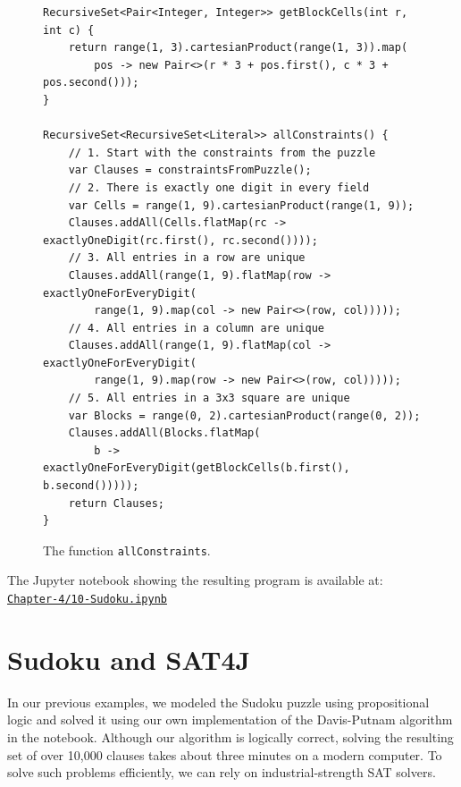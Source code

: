 \begin{figure}[!ht]
\centering
\begin{verbatim}
RecursiveSet<Pair<Integer, Integer>> getBlockCells(int r, int c) {
    return range(1, 3).cartesianProduct(range(1, 3)).map(
        pos -> new Pair<>(r * 3 + pos.first(), c * 3 + pos.second()));
}

RecursiveSet<RecursiveSet<Literal>> allConstraints() {
    // 1. Start with the constraints from the puzzle
    var Clauses = constraintsFromPuzzle();
    // 2. There is exactly one digit in every field
    var Cells = range(1, 9).cartesianProduct(range(1, 9));
    Clauses.addAll(Cells.flatMap(rc -> exactlyOneDigit(rc.first(), rc.second())));
    // 3. All entries in a row are unique
    Clauses.addAll(range(1, 9).flatMap(row -> exactlyOneForEveryDigit(
        range(1, 9).map(col -> new Pair<>(row, col)))));
    // 4. All entries in a column are unique
    Clauses.addAll(range(1, 9).flatMap(col -> exactlyOneForEveryDigit(
        range(1, 9).map(row -> new Pair<>(row, col)))));
    // 5. All entries in a 3x3 square are unique
    var Blocks = range(0, 2).cartesianProduct(range(0, 2));
    Clauses.addAll(Blocks.flatMap(
        b -> exactlyOneForEveryDigit(getBlockCells(b.first(), b.second()))));
    return Clauses;
}
\end{verbatim}
\vspace*{-0.3cm}
\caption{The function \texttt{allConstraints}.}
\label{fig:sudoku-allConstraints}
\end{figure}
The Jupyter notebook showing the resulting program is available at:
\\[0.2cm]
\hspace*{1.3cm}
\href{https://github.com/karlstroetmann/Logic/blob/master/Java/Chapter-4/10-Sudoku.ipynb}{\texttt{Chapter-4/10-Sudoku.ipynb}}

\FloatBarrier

\section{Sudoku and SAT4J}
In our previous examples, we modeled the Sudoku puzzle using propositional logic and solved it using our own
implementation of the Davis-Putnam algorithm in the notebook. Although our algorithm
is logically correct, solving the resulting set of over 10,000 clauses takes about three minutes on a modern
computer. To solve such problems efficiently, we can rely on industrial-strength SAT solvers. 

